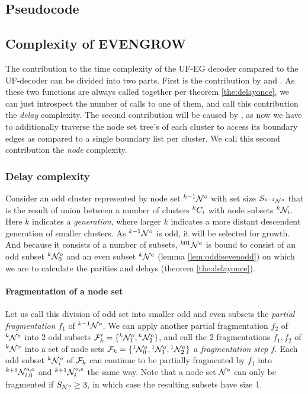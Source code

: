 
\subsection{Pseudocode}

\subsection{Complexity of EVENGROW}

The contribution to the time complexity of the UF-EG decoder compared to the UF-decoder can be divided into two parts. First is the contribution by  and . As these two functions are always called together per theorem \ref{the:delayonce}, we can just introspect the number of calls to one of them, and call this contribution the \emph{delay} complexity. The second contribution will be caused by , as now we have to additionally traverse the node set tree's of each cluster to access its boundary edges as compared to a single boundary list per cluster. We call this second contribution the \emph{node} complexity.

\subsubsection{Delay complexity}

Consider an odd cluster represented by node set ${}^{k-1}\mathcal{N}^o$ with set size $S_{{}^{k-1}\mathcal{N}^o}$ that is the result of union between a number of clusters ${}^{k}C_i$ with node subsets ${}^{k}\mathcal{N}_i$. Here $k$ indicates a \emph{generation}, where larger $k$ indicates a more distant descendent generation of smaller clusters. As ${}^{k-1}\mathcal{N}^o$ is odd, it will be selected for growth. And because it consists of a number of subsets, ${}^{k01}\mathcal{N}^o$ is bound to consist of an odd subset ${}^{k}\mathcal{N}^o_0$ and an even subset ${}^{k}\mathcal{N}^e$ (lemma \ref{lem:oddisevenodd}) on which we are to calculate the parities and delays (theorem \ref{the:delayonce}).

\paragraph{Fragmentation of a node set}

Let us call this division of odd set into smaller odd and even subsets the \emph{partial fragmentation} $f_1$ of ${}^{k-1}\mathcal{N}^o$. We can apply another partial fragmentation $f_2$ of ${}^{k}\mathcal{N}^e$ into 2 odd subsets $\mathcal{F}'_k=\{{}^{k}\mathcal{N}^{o}_1, {}^{k}\mathcal{N}^{o}_2\}$, and call the 2 fragmentations $f_1, f_2$ of ${}^{k}\mathcal{N}^o$ into a set of node sets $\mathcal{F}_k = \{{}^{1}\mathcal{N}^o_0, {}^{1}\mathcal{N}^{o}_1, {}^{1}\mathcal{N}^{o}_2\}$ a \emph{fragmentation step} $f$. Each odd subset ${}^{k}\mathcal{N}^o_i$ of $\mathcal{F}_k$ can continue to be partially fragmented by $f_1$ into ${}^{k+1}\mathcal{N}^{o,o}_{i, 0}$ and ${}^{k+1}\mathcal{N}^{o,e}_i$ the same way. Note that a node set $\mathcal{N}^o$ can only be fragmented if $S_{\mathcal{N}^o} \geq 3$, in which case the resulting subsets have size 1.

